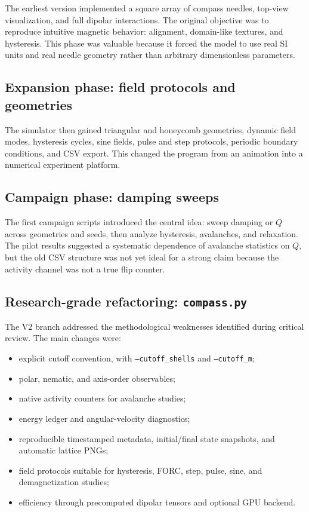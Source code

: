 \documentclass[11pt,a4paper]{article}
\newcommand{\code}[1]{\texttt{#1}}
\begin{document}
The earliest version implemented a square array of compass needles, top-view visualization, and full dipolar interactions. The original objective was to reproduce intuitive magnetic behavior: alignment, domain-like textures, and hysteresis. This phase was valuable because it forced the model to use real SI units and real needle geometry rather than arbitrary dimensionless parameters.

\subsection{Expansion phase: field protocols and geometries}

The simulator then gained triangular and honeycomb geometries, dynamic field modes, hysteresis cycles, sine fields, pulse and step protocols, periodic boundary conditions, and CSV export. This changed the program from an animation into a numerical experiment platform.

\subsection{Campaign phase: damping sweeps}

The first campaign scripts introduced the central idea: sweep damping or $Q$ across geometries and seeds, then analyze hysteresis, avalanches, and relaxation. The pilot results suggested a systematic dependence of avalanche statistics on $Q$, but the old CSV structure was not yet ideal for a strong claim because the activity channel was not a true flip counter.

\subsection{Research-grade refactoring: \code{compass.py}}

The V2 branch addressed the methodological weaknesses identified during critical review. The main changes were:

\begin{itemize}[leftmargin=*]
\item explicit cutoff convention, with \code{--cutoff\_shells} and \code{--cutoff\_m};
\item polar, nematic, and axis-order observables;
\item native activity counters for avalanche studies;
\item energy ledger and angular-velocity diagnostics;
\item reproducible timestamped metadata, initial/final state snapshots, and automatic lattice PNGs;
\item field protocols suitable for hysteresis, FORC, step, pulse, sine, and demagnetization studies;
\item efficiency through precomputed dipolar tensors and optional GPU backend.
\end{itemize}
\end{document}
